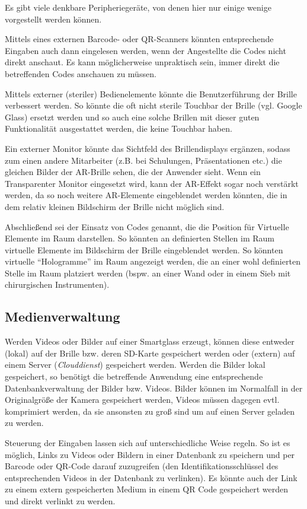 Es gibt viele denkbare Peripheriegeräte, von denen hier nur einige wenige vorgestellt werden können.

Mittels eines externen Barcode- oder QR-Scanners könnten entsprechende Eingaben auch dann eingelesen werden, wenn der Angestellte die Codes nicht direkt anschaut. Es kann möglicherweise unpraktisch sein, immer direkt die betreffenden Codes anschauen zu müssen. 

Mittels externer (steriler) Bedienelemente könnte die Benutzerführung der Brille verbessert werden. So könnte die oft nicht sterile Touchbar der Brille (vgl. Google Glass) ersetzt werden und so auch eine solche Brillen mit dieser guten Funktionalität ausgestattet werden, die keine Touchbar haben. 

Ein externer Monitor könnte das Sichtfeld des Brillendisplays ergänzen, sodass zum einen andere Mitarbeiter (z.B. bei Schulungen, Präsentationen etc.) die gleichen Bilder der AR-Brille sehen, die der Anwender sieht. Wenn ein Transparenter Monitor eingesetzt wird, kann der AR-Effekt sogar noch verstärkt werden, da so noch weitere AR-Elemente eingeblendet werden könnten, die in dem relativ kleinen Bildschirm der Brille nicht möglich sind.

Abschließend sei der Einsatz von Codes genannt, die die Position für Virtuelle Elemente im Raum darstellen. So könnten an definierten Stellen im Raum virtuelle Elemente im Bildschirm der Brille eingeblendet werden. So könnten virtuelle \enquote{Hologramme} im Raum angezeigt werden, die an einer wohl definierten Stelle im Raum platziert werden (bspw. an einer Wand oder in einem Sieb mit chirurgischen Instrumenten).
%
%
%
%
%
%
\subsection{Medienverwaltung}
\label{sec:Medienverwaltung}
Werden Videos oder Bilder auf einer Smartglass erzeugt, können diese entweder (lokal) auf der Brille bzw. deren SD-Karte gespeichert werden oder (extern) auf einem Server (\emph{Clouddienst}) gespeichert werden. Werden die Bilder lokal gespeichert, so benötigt die betreffende Anwendung eine entsprechende Datenbankverwaltung der Bilder bzw. Videos. Bilder können im Normalfall in der Originalgröße der Kamera gespeichert werden, Videos müssen dagegen evtl. komprimiert werden, da sie ansonsten zu groß sind um auf einen Server geladen zu werden. 

Steuerung der Eingaben lassen sich auf unterschiedliche Weise regeln. So ist es möglich, Links zu Videos oder Bildern in einer Datenbank zu speichern und per Barcode oder QR-Code darauf zuzugreifen (den Identifikationsschlüssel des entsprechenden Videos in der Datenbank zu verlinken). Es könnte auch der Link zu einem extern gespeicherten Medium in einem QR Code gespeichert werden und direkt verlinkt zu werden. 

